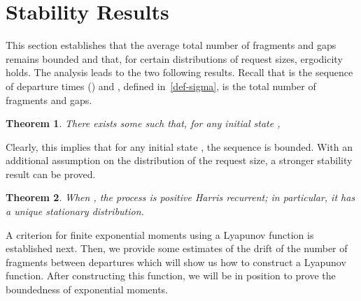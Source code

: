 \documentclass{amsart}
\newtheorem{theorem}{Theorem}
\begin{document}
\section{Stability Results} \label{sec:stab}
This section  establishes that the average total number of fragments
and gaps remains bounded and that, for certain distributions of
request sizes, ergodicity holds. The analysis leads to the
two following results. Recall that  is the sequence of
departure times () and , defined
in~\eqref{def-sigma}, is the total number of fragments and gaps.
\begin{theorem} \label{thm:sup}
There exists some  such that, for any initial state ,
 
\end{theorem}
Clearly, this implies that for any initial state , the
sequence  is bounded. With an
additional assumption on the distribution of the request size, a stronger stability result can be proved.
\begin{theorem} \label{thm:stab}
When , the process  is positive Harris
recurrent; in particular, it has a unique stationary distribution.
\end{theorem}
A criterion for finite exponential moments using a Lyapunov function
is established next.  Then, we provide  some estimates of the drift
of the number of fragments between departures which will show us how
to construct a Lyapunov function.  After constructing this function,
we will be in position to prove  the boundedness of exponential
moments.
\end{document}
